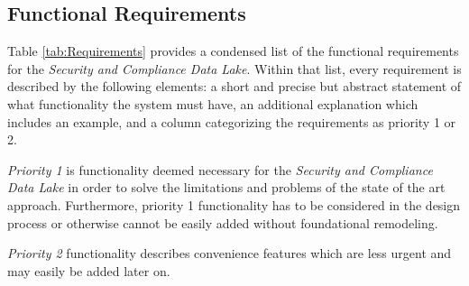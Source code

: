 \subsection{Functional Requirements}
Table \ref{tab:Requirements} provides a condensed list of the functional requirements for the \emph{Security and Compliance Data Lake}. Within that list, every requirement is described by the following elements: a short and precise but abstract statement of what functionality the system must have, an additional explanation which includes an example, and a column categorizing the requirements as priority 1 or 2.\par 
\emph{Priority 1} is functionality deemed necessary for the \emph{Security and Compliance Data Lake} in order to solve the limitations and problems of the state of the art approach. Furthermore, priority 1 functionality has to be considered in the design process or otherwise cannot be easily added without foundational remodeling.\par
\emph{Priority 2} functionality describes convenience features which are less urgent and may easily be added later on.
